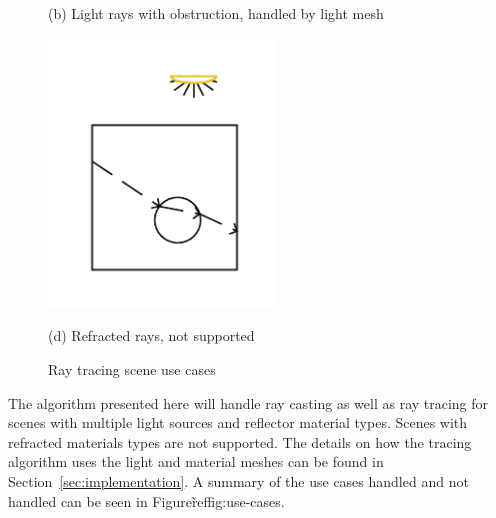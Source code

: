 \begin{figure}[!htb]
  (b) Light rays with obstruction, handled by light mesh
  
  \includegraphics[width=6cm]{drawings/Case_4.pdf}
  
  (d) Refracted rays, not supported
  
\endminipage
\caption{Ray tracing scene use cases}
\label{fig:use-cases}
\end{figure}


The algorithm presented here will handle ray casting as well as ray tracing for
scenes with multiple light sources and reflector material types.  Scenes with
refracted materials types are not supported.  The details on how the tracing
algorithm uses the light and material meshes can be found in 
Section~\ref{sec:implementation}.  A summary of the use cases handled and not 
handled can be seen in Figure\~ref{fig:use-cases}.

















